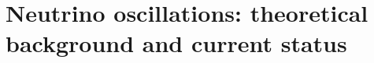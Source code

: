\chapter{Neutrino oscillations: theoretical background and current status}
\label{chap:theory}

\begin{comment}
TODO: Write the story of the theory chapter

TODO: Write the theory chapter section outline

TODO: Add all the sections below

### Historical background (~1500 words)

Proposal of a mysterious undetector particle to explain beta decays in the 1930s through to the resolutions of a 30-year problem with the confirmation of oscillations in the early 2000s and onto the precision era.
Neutrino oscillations first discoveed in 1957 when Bruno Pornecorvo proposed a model in which neutrinos oscilate to antineutrinos and back, similar to the kain. It was actually shown that neutrinos iscilate from one flavour to another.
Wolfgang Pauli first pusoluated the neutrino in 1931 to account for the non-conservation of energy/angular momentum in beta decays. A simple two-body decay at rest should produce an electron carrying away a fixed kinetci energy corresponding to the difference in binding energies of the nuclei, but a continuos spectrum was observed. Therefore, he postulated the extistnse of a unseen second particle, alwso emmited in the decay which was undetected. This must be a neutral spin-1/2 fermion, and he named it the 'neutron'
Was named neutrino after the neutron was discovered.
The antineutrino was discovered by Reines and Cowan in 1956, using inverse beta decay in a 200l tank of water, detecting neutrinos from the Los Alamos nuclear reactor.
Muon neutrino discovered by the 'long track' from the decays of pions from a reactor in 1988, got a nobel prize.
DONUT finally found the tau neutrino in 2000 using 800GeV protons from the Tevatron.
Hence, all flavours of neutrino had been found, but the strongest constraint is due to the width of the Z^0 resonance. THis indicates the number of active neutrino states can only be 1.984+-0.008. Therefore, any as yet undiscovered neutrinos must be sterile, in that they do not couple to the weak interaction.
Cosmology can also constrain the number of active neutrino with a value about 3.3+-0.27, the planck satellite did this.


\end{comment}
